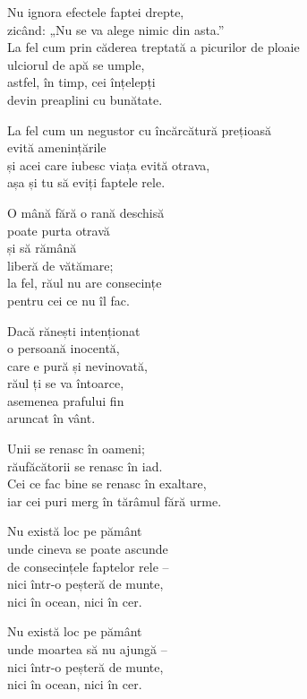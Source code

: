 Nu ignora efectele faptei drepte,\\
zicând: „Nu se va alege nimic din asta.”\\
La fel cum prin căderea treptată a picurilor de ploaie\\
ulciorul de apă se umple,\\
astfel, în timp, cei înțelepți\\
devin preaplini cu bunătate.


La fel cum un negustor cu încărcătură prețioasă\\
evită amenințările\\
și acei care iubesc viața evită otrava,\\
așa și tu să eviți faptele rele.


O mână fără o rană deschisă\\
poate purta otravă\\
și să rămână \\
liberă de vătămare;\\
la fel, răul nu are consecințe\\
pentru cei ce nu îl fac.


Dacă rănești intenționat\\
o persoană inocentă,\\
care e pură și nevinovată,\\
răul ți se va întoarce,\\
asemenea prafului fin\\
aruncat în vânt.


Unii se renasc în oameni;\\
răufăcătorii se renasc în iad.\\
Cei ce fac bine se renasc în exaltare,\\
iar cei puri merg în tărâmul fără urme.


Nu există loc pe pământ\\
unde cineva se poate ascunde\\
de consecințele faptelor rele –\\
nici într-o peșteră de munte,\\
nici în ocean, nici în cer.


Nu există loc pe pământ\\
unde moartea să nu ajungă –\\
nici într-o peșteră de munte,\\
nici în ocean, nici în cer.

